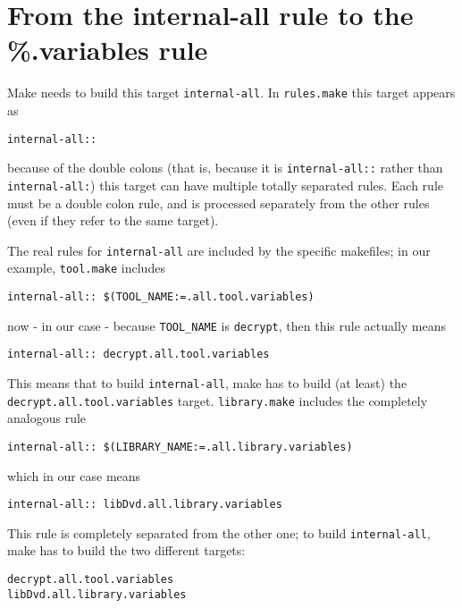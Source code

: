 \documentclass[a4paper]{article}
\begin{document}
\section{From the internal-all rule to the \%.variables rule}
Make needs to build this target \texttt{internal-all}.  In
\texttt{rules.make} this target appears as
\begin{verbatim}
internal-all::
\end{verbatim}
because of the double colons (that is, because it is
\texttt{internal-all::} rather than \texttt{internal-all:}) this
target can have multiple totally separated rules.  Each rule must be a
double colon rule, and is processed separately from the other rules
(even if they refer to the same target).

The real rules for \texttt{internal-all} are included by the specific 
makefiles; in our example, \texttt{tool.make} includes
\begin{verbatim}
internal-all:: $(TOOL_NAME:=.all.tool.variables)
\end{verbatim} %
now - in our case - because \texttt{TOOL\_NAME} is \texttt{decrypt}, then
this rule actually means
\begin{verbatim} 
internal-all:: decrypt.all.tool.variables
\end{verbatim}
This means that to build \texttt{internal-all}, make has to build (at
least) the \texttt{decrypt.all.tool.variables} target.
\texttt{library.make} includes the completely analogous rule
\begin{verbatim}
internal-all:: $(LIBRARY_NAME:=.all.library.variables) 
\end{verbatim} %
which in our case means 
\begin{verbatim}
internal-all:: libDvd.all.library.variables
\end{verbatim}
This rule is completely separated from the other one; to build
\texttt{internal-all}, make has to build the two different targets:
\begin{verbatim}
decrypt.all.tool.variables
libDvd.all.library.variables
\end{verbatim}
\end{document}
